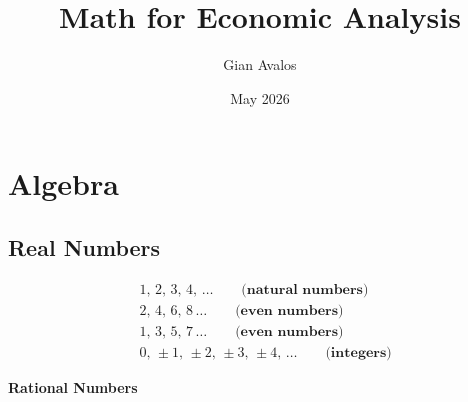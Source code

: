 \documentclass[12pt]{article}
\title{Math for Economic Analysis}
\author{Gian Avalos}
\date{May 2026}
\begin{document}
\maketitle

\clearpage
\tableofcontents

\clearpage
\section{Algebra}

\subsection{Real Numbers}

\begin{align*}
    &1, \, 2, \, 3, \, 4, \, \ldots \quad \quad \textbf{(natural numbers)}\\[3pt]
    &2, \, 4, \, 6, \, 8 \, \ldots \quad \quad \textbf{(even numbers)}\\[3pt]
    &1, \, 3, \, 5, \, 7 \, \ldots \quad \quad \textbf{(even numbers)}\\[3pt]
    &0, \, \pm 1, \, \pm2, \, \pm3, \, \pm4, \, \ldots \quad \quad \textbf{(integers)}
\end{align*}


\vspace{8pt} %

\large \textbf{Rational Numbers}
\end{document}
